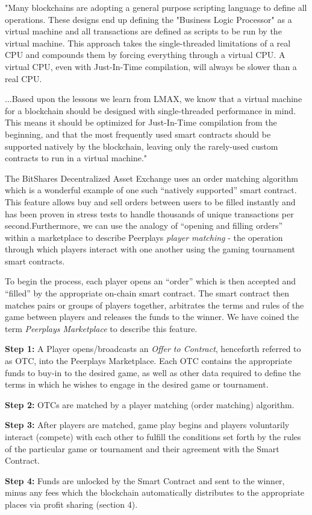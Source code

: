 \documentclass[a4paper,titlepage,final]{article}
\begin{document}
\begin{displayquote}
"Many blockchains are adopting a general purpose scripting language to define all operations. These designs end up defining the "Business Logic Processor" as a virtual machine and all transactions are defined as scripts to be run by the virtual machine. This approach takes the single-threaded limitations of a real CPU and compounds them by forcing everything through a virtual CPU. A virtual CPU, even with Just-In-Time compilation, will always be slower than a real CPU.

...Based upon the lessons we learn from LMAX, we know that a virtual machine for a blockchain should be designed with single-threaded performance in mind. This means it should be optimized for Just-In-Time compilation from the beginning, and that the most frequently used smart contracts should be supported natively by the blockchain, leaving only the rarely-used custom contracts to run in a virtual machine."
\end{displayquote}

The BitShares Decentralized Asset Exchange uses an order matching algorithm which is a wonderful example of one such “natively supported” smart contract.\cite{6}​ This feature allows buy and sell orders between users to be filled instantly and has been proven in stress tests to handle thousands of unique transactions per second.\cite{7}​ Furthermore, we can use the analogy ​of “opening and filling orders” within a marketplace to describe Peerplays \textit{​player matching} - the operation through which players interact with one another using the gaming tournament smart contracts.

To begin the process, each player opens an “order” which is then accepted and “filled” by the appropriate on-chain smart contract. The smart contract then matches pairs or groups of players together, arbitrates the terms and rules of the game between players and releases the funds to the winner. We have coined the term \textit{Peerplays Marketplace} ​to describe this feature.

\begin{displayquote}
\textbf{Step 1:} A Player opens/broadcasts an \textit{Offer to Contract}, henceforth referred to as OTC, into the Peerplays Marketplace. Each OTC contains the appropriate funds to buy-in to the desired game, as well as other data required to define the terms in which he wishes to engage in the desired game or tournament.

\textbf{Step 2:}​ OTCs are matched by a player matching (order matching) algorithm.

\textbf{Step 3:} After players are matched, game play begins and players voluntarily interact (compete) with each other to fulfill the conditions set forth by the rules of the particular game or tournament and their agreement with the Smart Contract.

\textbf{Step 4:} Funds are unlocked by the Smart Contract and sent to the winner, minus any fees which the blockchain automatically distributes to the appropriate places via profit sharing (section 4).
\end{displayquote}
\end{document}
